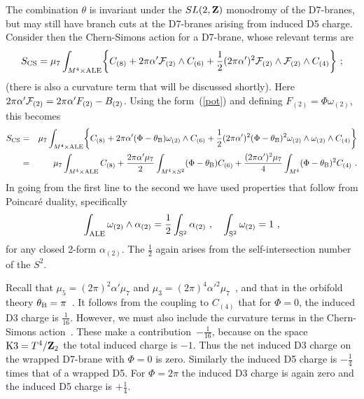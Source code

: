 \documentclass[a4paper,12pt]{article}
\renewcommand{\=}[1]{\bar{#1}}
\begin{document}
The combination $\theta$ is invariant under the $SL(2,{\bf
Z})$ monodromy of the D7-branes, but may still have branch cuts at the D7-branes
arising from induced D5 charge.  Consider then the Chern-Simons   action for a
D7-brane, whose relevant terms are
\begin{equation}
S_{\rm CS} = \mu_7 \int_{M^4 \times \rm ALE}
 \biggl\{ C_{(8)} + 2\pi\alpha'{\cal F}_{(2)} \wedge
C_{(6)} + \frac{1}{2}(2\pi\alpha')^2 {\cal F}_{(2)}  \wedge {\cal
F}_{(2)} \wedge C_{(4)} \biggr\}\ ;
\end{equation}
(there is also a curvature term that will be discussed shortly).
Here $2\pi\alpha'{\cal F}_{(2)} = 2\pi\alpha'{ F}_{(2)} - B_{(2)}$.
Using the form~(\ref{pot}) and defining ${ F}_{(2)} = \Phi \omega_{(2)}$,
this becomes
\begin{eqnarray}
S_{\rm CS} &=& \mu_7 \int_{M^4 \times \rm ALE}
 \biggl\{ C_{(8)} + 2\pi\alpha'(\Phi - \theta_{\rm B}){\omega}_{(2)} \wedge
C_{(6)} + \frac{1}{2}(2\pi\alpha')^2 (\Phi - \theta_{\rm B})^2 {\omega}_{(2)}
\wedge {\omega}_{(2)} \wedge C_{(4)} \biggr\} \nonumber\\
&=& \mu_7 \int_{M^4 \times \rm ALE} C_{(8)} +
\frac{2\pi\alpha' \mu_7}{2}
\int_{M^4 \times S^2}
(\Phi - \theta_{\rm
B}) C_{(6)} + \frac{(2\pi\alpha')^2 \mu_7}{4} \int_{M^4}
(\Phi - \theta_{\rm B})^2 C_{(4)}
\ .
\end{eqnarray}
In going from the first line to the second we have used properties that follow
from Poincar\'e duality, specifically
\begin{equation}
\int_{\rm ALE} \omega_{(2)} \wedge \alpha_{(2)}
= \frac{1}{2} \int_{\rm S^2} \alpha_{(2)}\ , \quad
\int_{\rm S^2} \omega_{(2)} = 1\ ,
\end{equation}
for any closed 2-form $\alpha_{(2)}$. 
The $\frac{1}{2}$ again arises from the self-intersection number of the
$S^2$.

Recall that $\mu_5 = (2\pi)^2 \alpha' \mu_7$ and
$\mu_3 = (2\pi)^4 \alpha'^2 \mu_7$~\cite{bigbook}, and that in the orbifold
theory $\theta_{\rm B} = \pi$~\cite{Aspin}.  It follows from the coupling to
$C_{(4)}$ that for $\Phi = 0$, the induced D3 charge is $\frac{1}{16}$.
However, we must also include the curvature terms in the Chern-Simons
action~\cite{BSV}.  These make a contribution~$-\frac{1}{16}$, because on the
space ${\rm K3}=T^4/{\bf Z}_2$ the total induced charge is $-1$.  Thus the net
induced D3 charge on the wrapped D7-brane with $\Phi = 0$ is zero.
Similarly the
induced D5 charge is $-\frac{1}{4}$ times that of a wrapped D5.  For $\Phi =
2\pi$ the induced D3 charge is again zero and the induced D5 charge is
$+\frac{1}{4}$.
\end{document}
